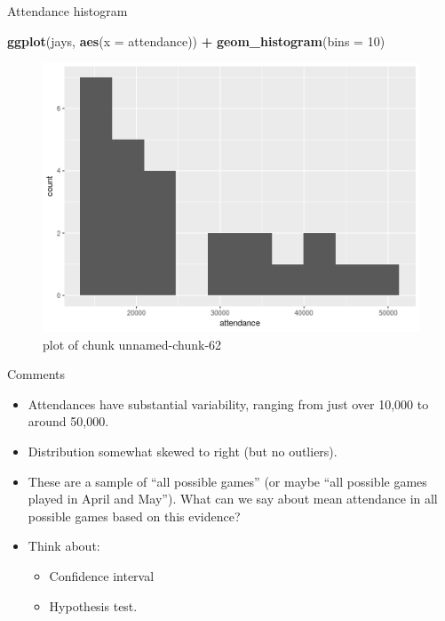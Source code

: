 \documentclass[ignorenonframetext,]{beamer}
\newenvironment{Shaded}{\begin{snugshade}}{\end{snugshade}}
\newcommand{\DataTypeTok}[1]{\textcolor[rgb]{0.13,0.29,0.53}{#1}}
\newcommand{\DecValTok}[1]{\textcolor[rgb]{0.00,0.00,0.81}{#1}}
\newcommand{\KeywordTok}[1]{\textcolor[rgb]{0.13,0.29,0.53}{\textbf{#1}}}
\newcommand{\NormalTok}[1]{#1}
\newcommand{\OperatorTok}[1]{\textcolor[rgb]{0.81,0.36,0.00}{\textbf{#1}}}
\newcommand{\StringTok}[1]{\textcolor[rgb]{0.31,0.60,0.02}{#1}}
\providecommand{\tightlist}{%
  \setlength{\itemsep}{0pt}\setlength{\parskip}{0pt}}
\begin{document}
\begin{frame}[fragile]{Attendance histogram}
\protect\hypertarget{attendance-histogram}{}

\begin{Shaded}
\begin{Highlighting}[]
\KeywordTok{ggplot}\NormalTok{(jays, }\KeywordTok{aes}\NormalTok{(}\DataTypeTok{x =}\NormalTok{ attendance)) }\OperatorTok{+}\StringTok{ }\KeywordTok{geom_histogram}\NormalTok{(}\DataTypeTok{bins =} \DecValTok{10}\NormalTok{)}
\end{Highlighting}
\end{Shaded}

\begin{figure}
\centering
\includegraphics{figure/unnamed-chunk-62-1.png}
\caption{plot of chunk unnamed-chunk-62}
\end{figure}

\end{frame}

\begin{frame}{Comments}
\protect\hypertarget{comments}{}

\begin{itemize}
\tightlist
\item
  Attendances have substantial variability, ranging from just over
  10,000 to around 50,000.
\item
  Distribution somewhat skewed to right (but no outliers).
\item
  These are a sample of ``all possible games'' (or maybe ``all possible
  games played in April and May''). What can we say about mean
  attendance in all possible games based on this evidence?
\item
  Think about:

  \begin{itemize}
  \tightlist
  \item
    Confidence interval
  \item
    Hypothesis test.
  \end{itemize}
\end{itemize}

\end{frame}
\end{document}
